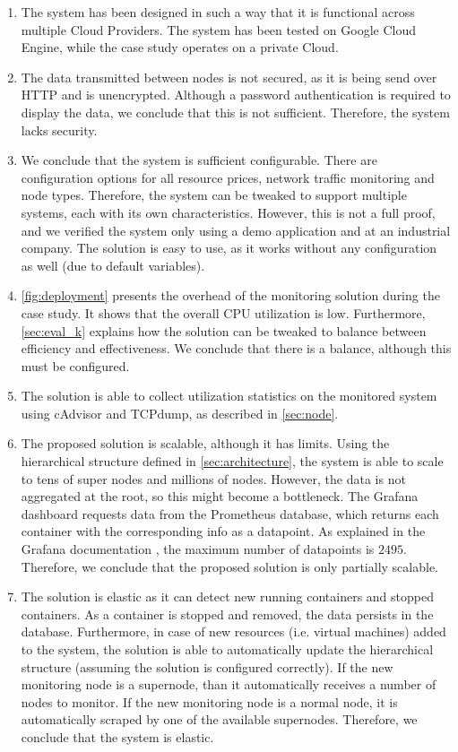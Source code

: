 \begin{enumerate}
    \item The system has been designed in such a way that it is functional across multiple Cloud Providers. The system has been tested on Google Cloud Engine, while the case study operates on a private Cloud.
    \item The data transmitted between nodes is not secured, as it is being send over HTTP and is unencrypted. Although a password authentication is required to display the data, we conclude that this is not sufficient. Therefore, the system lacks security.
    \item We conclude that the system is sufficient configurable. There are configuration options for all resource prices, network traffic monitoring and node types. Therefore, the system can be tweaked to support multiple systems, each with its own characteristics. However, this is not a full proof, and we verified the system only using a demo application and at an industrial company. The solution is easy to use, as it works without any configuration as well (due to default variables).
    \item \autoref{fig:deployment} presents the overhead of the monitoring solution during the case study. It shows that the overall CPU utilization is low. Furthermore, \autoref{sec:eval_k} explains how the solution can be tweaked to balance between efficiency and effectiveness. We conclude that there is a balance, although this must be configured.
    \item The solution is able to collect utilization statistics on the monitored system using cAdvisor and TCPdump, as described in \autoref{sec:node}.
    \item The proposed solution is scalable, although it has limits. Using the hierarchical structure defined in \autoref{sec:architecture}, the system is able to scale to tens of super nodes and millions of nodes. However, the data is not aggregated at the root, so this might become a bottleneck. The Grafana dashboard requests data from the Prometheus database, which returns each container with the corresponding info as a datapoint. As explained in the Grafana documentation \cite{grafana}, the maximum number of datapoints is $2495$. Therefore, we conclude that the proposed solution is only partially scalable.
    \item The solution is elastic as it can detect new running containers and stopped containers. As a container is stopped and removed, the data persists in the database. Furthermore, in case of new resources (i.e. virtual machines) added to the system, the solution is able to automatically update the hierarchical structure (assuming the solution is configured correctly). If the new monitoring node is a supernode, than it automatically receives a number of nodes to monitor. If the new monitoring node is a normal node, it is automatically scraped by one of the available supernodes. Therefore, we conclude that the system is elastic.

\end{enumerate}
